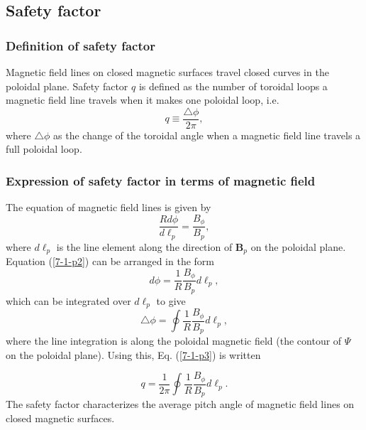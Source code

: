\documentclass{article}
\begin{document}
\subsection{Safety factor}

\subsubsection{Definition of safety factor}

Magnetic field lines on closed magnetic surfaces travel closed curves in the
poloidal plane. Safety factor $q$ is defined as the number of toroidal loops a
magnetic field line travels when it makes one poloidal loop, i.e.
\begin{equation}
  \label{7-1-p3} q \equiv \frac{\triangle \phi}{2 \pi},
\end{equation}
where $\triangle \phi$ as the change of the toroidal angle when a magnetic
field line travels a full poloidal loop.

\subsubsection{Expression of safety factor in terms of magnetic field}

The equation of magnetic field lines is given by
\begin{equation}
  \label{7-1-p2} \frac{R d \phi}{d \ell_p} = \frac{B_{\phi}}{B_p},
\end{equation}
where $d \ell_p$ is the line element along the direction of $\mathbf{B}_p$ on
the poloidal plane. Equation (\ref{7-1-p2}) can be arranged in the form
\begin{equation}
  d \phi = \frac{1}{R} \frac{B_{\phi}}{B_p} d \ell_p,
\end{equation}
which can be integrated over $d \ell_p$ to give
\begin{equation}
  \triangle \phi = \oint \frac{1}{R}  \frac{B_{\phi}}{B_p} d \ell_p,
\end{equation}
where the line integration is along the poloidal magnetic field (the contour
of $\Psi$ on the poloidal plane). Using this, Eq. (\ref{7-1-p3}) is written


\begin{equation}
  \label{9-5-e1} q = \frac{1}{2 \pi} \oint \frac{1}{R}  \frac{B_{\phi}}{B_p} d
  \ell_p .
\end{equation}
The safety factor characterizes the average pitch angle of magnetic field
lines on closed magnetic surfaces.
\end{document}
